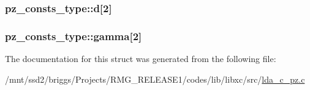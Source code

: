\hypertarget{structpz__consts__type_a3da4a99c0a5b9ea99c9f29da7def66f7}{
\subsubsection[{d}]{ pz\-\_\-consts\-\_\-type\-::d\mbox{[}2\mbox{]}}}\label{structpz__consts__type_a3da4a99c0a5b9ea99c9f29da7def66f7}
\hypertarget{structpz__consts__type_adddb0f678c3bc067875045d272a8af11}{
\subsubsection[{gamma}]{ pz\-\_\-consts\-\_\-type\-::gamma\mbox{[}2\mbox{]}}}\label{structpz__consts__type_adddb0f678c3bc067875045d272a8af11}


The documentation for this struct was generated from the following file\-:\begin{DoxyCompactItemize}
\item 
/mnt/ssd2/briggs/\-Projects/\-R\-M\-G\-\_\-\-R\-E\-L\-E\-A\-S\-E1/codes/lib/libxc/src/\hyperlink{lda__c__pz_8c}{lda\-\_\-c\-\_\-pz.\-c}\end{DoxyCompactItemize}
